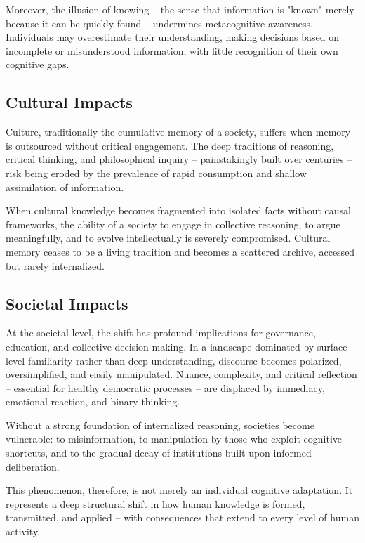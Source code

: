 Moreover, the illusion of knowing -- the sense that information is
"known" merely because it can be quickly found -- undermines
metacognitive awareness. Individuals may overestimate their
understanding, making decisions based on incomplete or misunderstood
information, with little recognition of their own cognitive gaps.

\subsection{Cultural Impacts}

Culture, traditionally the cumulative memory of a society, suffers when
memory is outsourced without critical engagement. The deep traditions of
reasoning, critical thinking, and philosophical inquiry -- painstakingly
built over centuries -- risk being eroded by the prevalence of rapid
consumption and shallow assimilation of information.

When cultural knowledge becomes fragmented into isolated facts without
causal frameworks, the ability of a society to engage in collective
reasoning, to argue meaningfully, and to evolve intellectually is
severely compromised. Cultural memory ceases to be a living tradition
and becomes a scattered archive, accessed but rarely internalized.

\subsection{Societal Impacts}

At the societal level, the shift has profound implications for
governance, education, and collective decision-making. In a landscape
dominated by surface-level familiarity rather than deep understanding,
discourse becomes polarized, oversimplified, and easily manipulated.
Nuance, complexity, and critical reflection -- essential for healthy
democratic processes -- are displaced by immediacy, emotional reaction,
and binary thinking.

Without a strong foundation of internalized reasoning, societies become
vulnerable: to misinformation, to manipulation by those who exploit
cognitive shortcuts, and to the gradual decay of institutions built upon
informed deliberation.

This phenomenon, therefore, is not merely an individual cognitive
adaptation. It represents a deep structural shift in how human knowledge
is formed, transmitted, and applied -- with consequences that extend to
every level of human activity.


